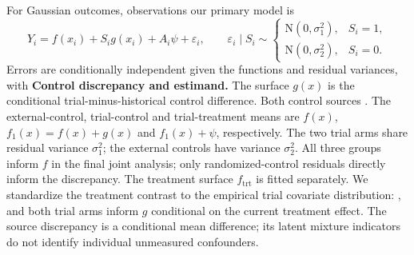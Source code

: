 \documentclass[11pt]{article}
\newcommand{\N}{\mathrm{N}}
\theoremstyle{remark}\newtheorem{remark}{Remark}[section]
\providecommand{\DIFaddtex}[1]{{\protect\color{blue} \sf #1}} %
\providecommand{\DIFdeltex}[1]{{\protect\color{red} \scriptsize #1}} %
\providecommand{\DIFaddbegin}{} %
\providecommand{\DIFaddend}{} %
\providecommand{\DIFdelbegin}{} %
\providecommand{\DIFdelend}{} %
\providecommand{\DIFadd}[1]{\texorpdfstring{\DIFaddtex{#1}}{#1}} %
\providecommand{\DIFdel}[1]{\texorpdfstring{\DIFdeltex{#1}}{}} %
\begin{document}
\DIFaddend For Gaussian outcomes, \DIFdelbegin \DIFdel{observations }\DIFdelend \DIFaddbegin \DIFadd{our primary model is
}\begin{equation}\label{eq:model}
Y_i=f(x_i)+S_i g(x_i)+A_i\psi+\varepsilon_i,\qquad
\varepsilon_i\mid S_i\sim
\begin{cases}\N(0,\sigma_1^2),&S_i=1,\\
\N(0,\sigma_2^2),&S_i=0.
\end{cases}
\end{equation}
\DIFadd{Errors }\DIFaddend are conditionally independent\DIFdelbegin \DIFdel{given the functions and residual variances, with
}%
\DIFdel{\textbf{Control discrepancy and estimand.}
The surface $g(x)$ is the conditional trial-minus-historical control difference. Both control sources }\DIFdelend \DIFaddbegin \DIFadd{. The external-control, trial-control and trial-treatment means are $f(x)$, $f_1(x)=f(x)+g(x)$ and $f_1(x)+\psi$, respectively. The two trial arms share residual variance $\sigma_1^2$; the external controls have variance $\sigma_2^2$. All three groups }\DIFaddend inform $f$\DIFdelbegin \DIFdel{in the final joint analysis; only randomized-control residuals directly inform the discrepancy. The treatment surface $f_{\mathrm{trt}}$ is
fitted separately. We standardize the treatment contrast to the empirical trial covariate distribution:
}%
\DIFdelend \DIFaddbegin \DIFadd{, and both trial arms inform $g$ conditional on the current treatment effect. The source discrepancy is a conditional mean difference; its latent mixture indicators do not identify individual unmeasured confounders.
}
\end{document}
